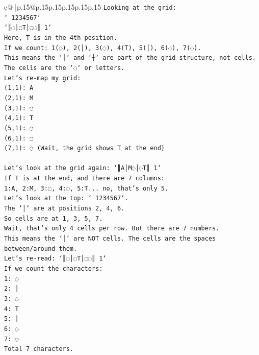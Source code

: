 \documentclass{article}
\begin{document}
{\begin{supertabular}{c@{$\;$}|p{.15\linewidth}@{}p{.15\linewidth}p{.15\linewidth}p{.15\linewidth}p{.15\linewidth}p{.15\linewidth}}
{{{\texttt{Looking at the grid:} \\
\texttt{` 1234567`} \\
\texttt{`║◌│◌T│◌◌║ 1`} \\
\texttt{Here, T is in the 4th position.} \\
\texttt{If we count: 1(◌), 2(│), 3(◌), 4(T), 5(│), 6(◌), 7(◌).} \\
\texttt{This means the `│` and `┼` are part of the grid structure, not cells.} \\
\texttt{The cells are the `◌` or letters.} \\
\texttt{Let's re{-}map my grid:} \\
\texttt{(1,1): A} \\
\texttt{(2,1): M} \\
\texttt{(3,1): ◌} \\
\texttt{(4,1): T} \\
\texttt{(5,1): ◌} \\
\texttt{(6,1): ◌} \\
\texttt{(7,1): ◌ (Wait, the grid shows T at the end)} \\
\\ 
\texttt{Let's look at the grid again: `║A│M◌│◌T║ 1`} \\
\texttt{If T is at the end, and there are 7 columns:} \\
\texttt{1:A, 2:M, 3:◌, 4:◌, 5:T... no, that's only 5.} \\
\texttt{Let's look at the top: ` 1234567`.} \\
\texttt{The `│` are at positions 2, 4, 6.} \\
\texttt{So cells are at 1, 3, 5, 7.} \\
\texttt{Wait, that's only 4 cells per row. But there are 7 numbers.} \\
\texttt{This means the `│` are NOT cells. The cells are the spaces between/around them.} \\
\texttt{Let's re{-}read: `║◌│◌T│◌◌║ 1`} \\
\texttt{If we count the characters:} \\
\texttt{1: ◌} \\
\texttt{2: │} \\
\texttt{3: ◌} \\
\texttt{4: T} \\
\texttt{5: │} \\
\texttt{6: ◌} \\
\texttt{7: ◌} \\
\texttt{Total 7 characters.} \\
}}}
\end{supertabular}}
\end{document}
